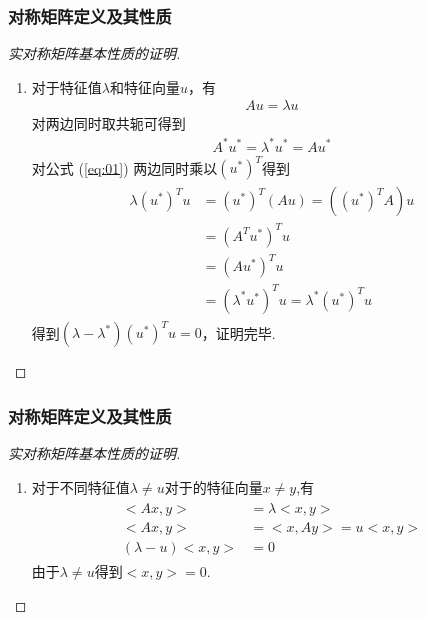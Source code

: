 \documentclass[UTF8, aspectratio=169, 9pt]{ctexbeamer}
\begin{document}
\begin{frame}
  \frametitle{对称矩阵定义及其性质}
  \begin{proof}[实对称矩阵基本性质的证明]
    \begin{enumerate}
    \item 对于特征值$\lambda$和特征向量$u$，有
      \begin{align}
        \label{eq:01}
        Au = \lambda u
      \end{align}
      对两边同时取共轭可得到
      \begin{align}
        \label{eq:02}
        A^{*} u^{*} = \lambda^{*} u^{*} = A u^{*}
      \end{align}
      对公式 (\ref{eq:01}) 两边同时乘以$( u^{*} )^{T}$得到
      \begin{align}
        \begin{split}
          \lambda (u^{*})^T u &=  ( u^{*} )^T (Au) = ( (u^{*})^T A ) u \\
          &= ( A^T u^{*} )^T u \\
          &= ( A u^{*} )^T u \\
          &= ( \lambda^{*} u^{*} )^T u = \lambda^{*} ( u^{*} )^T u
        \end{split}
      \end{align}
      得到$(\lambda - \lambda^{*} ) (u^{*})^T u = 0$，证明完毕.
    \end{enumerate}
  \end{proof}  
\end{frame}

\begin{frame}
  \frametitle{对称矩阵定义及其性质}
  \begin{proof}[实对称矩阵基本性质的证明]
    \begin{enumerate}[2]
    \item 对于不同特征值$\lambda \neq u$对于的特征向量$x \neq y$,有
      \begin{align}
        \begin{split}
          <A x, y> &= \lambda <x, y>  \\
          <A x, y> &= <x, A y> = u <x, y> \\
          ( \lambda - u ) <x, y> &= 0
        \end{split}
      \end{align}
      由于$ \lambda \neq u $得到$<x, y> = 0$.
    \end{enumerate}
  \end{proof}
 \end{frame}
\end{document}
